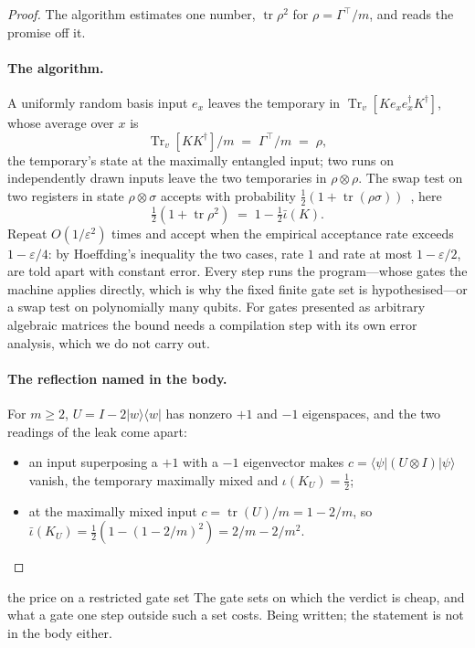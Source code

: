 \documentclass[acmsmall,screen,review,anonymous,nonacm]{acmart}
\begin{document}
\stmtAverageCost
\begin{proof}
The algorithm estimates one number, $\operatorname{tr}\rho^{2}$ for $\rho =
\Gamma^{\top}/m$, and reads the promise off it.

\paragraph{The algorithm.} A uniformly random basis input $e_x$ leaves the
temporary in $\operatorname{Tr}_v[K e_x e_x^{\dagger} K^{\dagger}]$, whose
average over $x$ is
\[
  \operatorname{Tr}_v[KK^{\dagger}]/m \;=\; \Gamma^{\top}/m \;=\; \rho ,
\]
the temporary's state at the maximally entangled input; two runs on
independently drawn inputs leave the two temporaries in $\rho \otimes \rho$. The swap test on two registers in state $\rho \otimes \sigma$
accepts with probability $\tfrac12(1 +
\operatorname{tr}(\rho\sigma))$~\cite{Buhrman2001Fingerprinting}, here
\[
  \tfrac12(1 + \operatorname{tr}\rho^{2}) \;=\; 1 - \tfrac12\bar\iota(K) .
\]
Repeat $O(1/\varepsilon^{2})$ times and accept when the empirical acceptance
rate exceeds $1 - \varepsilon/4$: by Hoeffding's inequality the two cases,
rate $1$ and rate at most $1 - \varepsilon/2$, are told apart with constant
error. Every step runs the program---whose gates the machine
applies directly, which is why the fixed finite gate set is
hypothesised---or a swap test on polynomially many qubits. For
gates presented as arbitrary algebraic matrices the bound needs a compilation
step with its own error analysis, which we do not carry out.

\paragraph{The reflection named in the body.} For $m \ge 2$, $U = I -
2|w\rangle\langle w|$ has nonzero $+1$ and $-1$ eigenspaces, and the two
readings of the leak come apart:
\begin{itemize}
\item an input superposing a $+1$ with a $-1$ eigenvector makes $c = \langle
  \psi|(U \otimes I)|\psi\rangle$ vanish, the temporary maximally mixed and
  $\iota(K_U) = \tfrac12$;
\item at the maximally mixed input $c = \operatorname{tr}(U)/m = 1 - 2/m$, so
  $\bar\iota(K_U) = \tfrac12(1 - (1 - 2/m)^{2}) = 2/m - 2/m^{2}$.
\end{itemize}
\end{proof}

\begin{planned}{the price on a restricted gate set}
The gate sets on which the verdict is cheap, and what a gate one step outside
such a set costs. Being written; the statement is not in the body either.
\end{planned}
\end{document}
